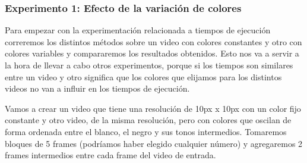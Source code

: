 \subsubsection{Experimento 1: Efecto de la variaci\'on de colores}
\par Para empezar con la experimentaci\'on relacionada a tiempos de ejecuci\'on correremos los distintos m\'etodos sobre un video con colores constantes y otro con colores variables y compararemos los resultados obtenidos. Esto nos va a servir a la hora de llevar a cabo otros experimentos, porque si los tiempos son similares entre un video y otro significa que los colores que elijamos para los distintos videos no van a influir en los tiempos de ejecuci\'on.

\par Vamos a crear un video que tiene una resoluci\'on de 10px x 10px con un color fijo constante y otro video, de la misma resoluci\'on, pero con colores que oscilan de forma ordenada entre el blanco, el negro y sus tonos intermedios. Tomaremos bloques de 5 frames (podr\'iamos haber elegido cualquier n\'umero) y agregaremos 2 frames intermedios entre cada frame del video de entrada.



\begin{figure}[ht]
	\begin{center}
	\end{center}
\end{figure}


